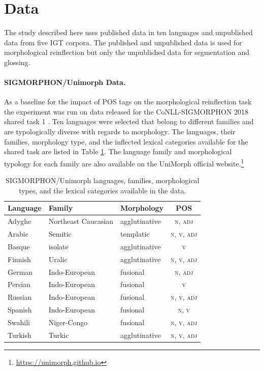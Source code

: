 \section{Data}
\label{sec:posdata}

The study described here uses published data in ten languages and unpublished data from five IGT corpora. The published and unpublished data is used for morphological reinflection but only the unpublished data for segmentation and glossing.  

\paragraph{SIGMORPHON/Unimorph Data.}
As a baseline for the impact of POS tags on the morphological reinflection task the experiment was run on data released for the CoNLL-SIGMORPHON 2018 shared task 1 \citep{cotterell_conllsigmorphon_2018}. Ten languages were selected that belong to different families and are typologically diverse with regards to morphology. The languages, their families, morphology type, and the inflected lexical categories available for the shared task are listed in Table \ref{tab:SIGPOSdata}. The language family and morphological typology for each family are also available on the UniMorph official website.\footnote{\url{https://unimorph.github.io}}  


\begin{table}[!tb]
    \centering
    \begin{tabular}{lllc}
        \textbf{Language} & \textbf{Family} & \textbf{Morphology} & \textbf{POS} \\
        \hline
        Adyghe  & Northeast Caucasian & agglutinative & \textsc{n}, \textsc{adj} \\
        Arabic & Semitic & templatic & \textsc{n}, \textsc{v}, \textsc{adj} \\
        Basque & isolate & agglutinative & \textsc{v} \\
        Finnish & Uralic & agglutinative & \textsc{n}, \textsc{v}, \textsc{adj} \\
        German & Indo-European & fusional & \textsc{n}, \textsc{adj} \\
        Persian & Indo-European & fusional & \textsc{v} \\
        Russian & Indo-European & fusional & \textsc{n}, \textsc{v}, \textsc{adj} \\
        Spanish & Indo-European & fusional & \textsc{n}, \textsc{v} \\
        Swahili & Niger-Congo & fusional & \textsc{n}, \textsc{v}, \textsc{adj} \\
        Turkish & Turkic & agglutinative & \textsc{n}, \textsc{v}, \textsc{adj} \\
    \end{tabular}
    \caption[SIGMORPHON/Unimorph Data]{SIGMORPHON/Unimorph languages, families, morphological types, and the lexical categories available in the data.}
    \label{tab:SIGPOSdata}
\end{table}


